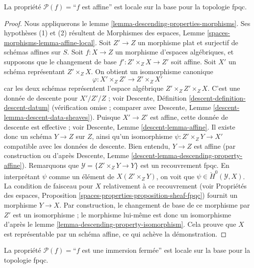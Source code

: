 \begin{lemma}
\label{lemma-descending-property-affine}
La propriété $\mathcal{P}(f) =$``$f$ est affine''
est locale sur la base pour la topologie fpqc.
\end{lemma}

\begin{proof}
Nous appliquerons le
lemme \ref{lemma-descending-properties-morphisms}.
Ses hypothèses (1) et (2) résultent de
Morphismes des espaces,
Lemme \ref{spaces-morphisms-lemma-affine-local}.
Soit $Z' \to Z$ un morphisme plat et surjectif de schémas affines sur $S$.
Soit $f : X \to Z$ un morphisme d'espaces algébriques, et supposons
que le changement de base $f' : Z' \times_Z X \to Z'$ soit affine.
Soit $X'$ un schéma représentant $Z' \times_Z X$.
On obtient un isomorphisme canonique
$$
\varphi : X' \times_Z Z' \longrightarrow Z' \times_Z X'
$$
car les deux schémas représentent l'espace algébrique $Z' \times_Z Z' \times_Z X$.
C'est une donnée de descente pour $X'/Z'/Z$ ; voir
Descente, Définition \ref{descent-definition-descent-datum}
(vérification omise ; comparer avec
Descente, Lemme \ref{descent-lemma-descent-data-sheaves}).
Puisque $X' \to Z'$ est affine, cette donnée de descente est effective ; voir
Descente, Lemme \ref{descent-lemma-affine}.
Il existe donc un schéma $Y \to Z$ sur $Z$, ainsi qu'un
isomorphisme $\psi : Z' \times_Z Y \to X'$ compatible avec les données de descente.
Bien entendu, $Y \to Z$ est affine (par construction ou d'après
Descente, Lemme \ref{descent-lemma-descending-property-affine}).
Remarquons que $\mathcal{Y} = \{Z' \times_Z Y \to Y\}$ est un
recouvrement fpqc. En interprétant $\psi$ comme un élément de
$X(Z' \times_Z Y)$, on voit que $\psi \in \check{H}^0(\mathcal{Y}, X)$.
La condition de faisceau pour $X$ relativement à ce recouvrement (voir
Propriétés des espaces, Proposition
\ref{spaces-properties-proposition-sheaf-fpqc})
fournit un morphisme $Y \to X$.
Par construction, le changement de base de ce morphisme par $Z'$ est un isomorphisme ; le morphisme lui-même est donc
un isomorphisme d'après le
lemme \ref{lemma-descending-property-isomorphism}.
Cela prouve que $X$ est représentable par un schéma affine, ce qui achève la démonstration.
\end{proof}

\begin{lemma}
\label{lemma-descending-property-closed-immersion}
La propriété $\mathcal{P}(f) =$``$f$ est une immersion fermée''
est locale sur la base pour la topologie fpqc.
\end{lemma}

